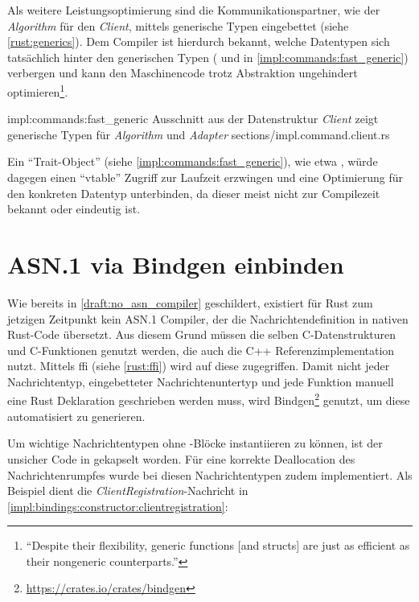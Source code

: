 Als weitere Leistungsoptimierung sind die Kommunikationspartner, wie der \textit{Algorithm} für den \textit{Client}, mittels generische Typen eingebettet (siehe \autoref{rust:generics}).
Dem Compiler ist hierdurch bekannt, welche Datentypen sich tatsächlich hinter den generischen Typen ( und  in \autoref{impl:commands:fast_generic}) verbergen und kann den Maschinencode trotz Abstraktion ungehindert optimieren\footnote{\enquote{Despite their flexibility, generic functions [and structs] are just as efficient as their nongeneric counterparts.}\cite[45]{rust:orly_programming}}.

\rustcinclude
	{impl:commands:fast_generic}
	{Ausschnitt aus der Datenstruktur \textit{Client} zeigt generische Typen für \textit{Algorithm} und \textit{Adapter}}
	{sections/impl.command.client.rs}
	
Ein \enquote{Trait-Object} (siehe \autoref{impl:commands:fast_generic}), wie etwa , würde dagegen einen \enquote{vtable} Zugriff zur Laufzeit erzwingen und eine Optimierung für den konkreten Datentyp unterbinden, da dieser meist nicht zur Compilezeit bekannt oder eindeutig ist.

\clearpage
\section{ASN.1 via Bindgen einbinden}
\label{impl:asn1_bindings}
\label{impl:issue:ffi}


Wie bereits in \autoref{draft:no_asn_compiler} geschildert, existiert für Rust zum jetzigen Zeitpunkt kein ASN.1 Compiler, der die Nachrichtendefinition in nativen Rust-Code übersetzt.
Aus diesem Grund müssen die selben C-Datenstrukturen und C-Funktionen genutzt werden, die auch die C++ Referenzimplementation nutzt.
Mittels \gls{ffi} (siehe \autoref{rust:ffi}) wird auf diese zugegriffen.
Damit nicht jeder Nachrichtentyp, eingebetteter Nachrichtenuntertyp und jede Funktion manuell eine Rust Deklaration geschrieben werden muss, wird Bindgen\footnote{\url{https://crates.io/crates/bindgen}} genutzt, um diese automatisiert zu generieren.

Um wichtige Nachrichtentypen ohne -Blöcke instantiieren zu können, ist der unsicher Code in  gekapselt worden.
Für eine korrekte Deallocation des Nachrichtenrumpfes wurde bei diesen Nachrichtentypen zudem  %
implementiert.
Als Beispiel dient die \textit{ClientRegistration}-Nachricht in \autoref{impl:bindings:constructor:clientregistration}:


